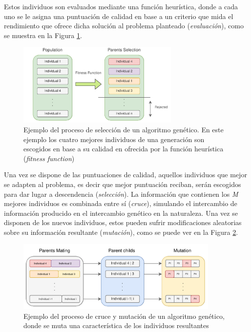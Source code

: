 Estos individuos son evaluados mediante una función heurística, donde a cada uno se le asigna una puntuación de calidad en base a un criterio que mida el rendimiento que ofrece dicha solución al problema planteado (\textit{evaluación}), como se muestra en la Figura \ref{GA_selection}.


\begin{figure}[h]
	\centering
	\includegraphics[width=8cm]{Figures/GA/selection.png}
	\caption[Ejemplo del proceso de selección de un algoritmo genético]{Ejemplo del proceso de selección de un algoritmo genético. En este ejemplo los cuatro mejores individuos de una generación son escogidos en base a su calidad en ofrecida por la función heurística (\textit{fitness function})}
	\label{GA_selection}
\end{figure}


Una vez se dispone de las puntuaciones de calidad, aquellos individuos que mejor se adapten al problema, es decir que mejor puntuación reciban, serán escogidos para dar lugar a descendencia (\textit{selección}). La información que contienen los \textit{M} mejores individuos es combinada entre sí (\textit{cruce}), simulando el intercambio de información producido en el intercambio genético en la naturaleza. Una vez se disponen de los nuevos individuos, estos pueden sufrir modificaciones aleatorias sobre su información resultante (\textit{mutación}), como se puede ver en la Figura \ref{GA_cruce_mutacion}.

\begin{figure}[h]
	\centering
	\includegraphics[width=10cm]{Figures/GA/cruce_mutacion.png}
	\caption[Ejemplo del proceso de cruce y mutación de un algoritmo genético] {Ejemplo del proceso de cruce y mutación de un algoritmo genético, donde se muta una característica de los individuos resultantes}
	\label{GA_cruce_mutacion}
\end{figure}

